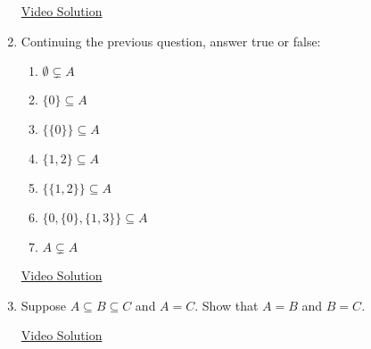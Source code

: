 \begin{enumerate}
	\href{https://youtu.be/kxglfP-FLpY}{Video Solution}
    
  \item Continuing the previous question, answer true or false:
  \begin{enumerate}
  	\item $\emptyset\subsetneq A$
    \item $\{0\}\subseteq A$
    \item $\bigl\{\{0\}\bigr\}\subseteq A$
    \item $\{1,2\} \subseteq A$
    \item $\bigl\{\{1,2\}\bigr\}\subseteq A$
    \item $\bigl\{0, \{0\}, \{1,3\}\bigr\}\subseteq A$
    \item $A\subsetneq A$
  \end{enumerate}
  
  \href{https://youtu.be/DBVsXTZH2-c}{Video Solution}
  
  
  \item Suppose $A\subseteq B\subseteq C$ and $A=C$. Show that $A=B$ and $B=C$. 
    
  \href{https://youtu.be/_YO7y1ryfy8}{Video Solution}
\end{enumerate}

